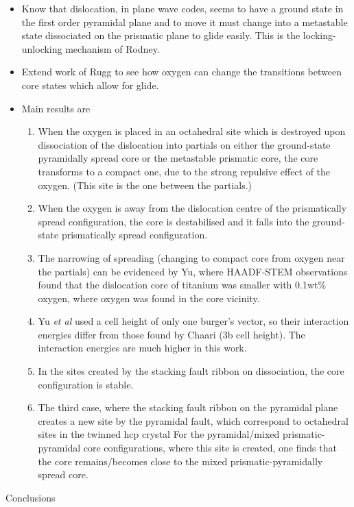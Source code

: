 \documentclass[a4paper,12pt,oneside,print,numbered,index,PageStyleIII]{PhDThesisPSnPDF}
\begin{document}
\begin{itemize}
\item Know that dislocation, in plane wave codes, seems to have a
ground state in the first order pyramidal plane and to move it
must change into a metastable state dissociated on the prismatic
plane to glide easily. This is the locking-unlocking mechanism of
Rodney.
\item Extend work of Rugg to see how oxygen can change the transitions
between core states which allow for glide.

\item Main results are
\begin{enumerate}
\item When the oxygen is placed in an octahedral site which is
destroyed upon dissociation of the dislocation into partials on either the
ground-state pyramidally spread core or the metastable
prismatic core, the core transforms to a compact
one, due to the strong repulsive effect of the oxygen. (This
site is the one between the partials.)
\item When the oxygen is away from the dislocation centre of the prismatically
spread configuration, the core is destabilised and it falls
into the ground-state prismatically spread configuration.
\item The narrowing of spreading (changing to compact core from
oxygen near the partials) can be evidenced by Yu, where
HAADF-STEM observations found that the dislocation core of
titanium was smaller with 0.1wt\% oxygen, where oxygen was
found in the core vicinity.
\item Yu \emph{et al} used a cell height of only one burger's vector, so
their interaction energies differ from those found by Chaari
(3b cell height). The interaction energies are much higher in
this work.
\item In the sites created by the stacking fault ribbon on
dissociation, the core configuration is stable.
\item The third case, where the stacking fault ribbon on the
pyramidal plane creates a new site by the pyramidal fault,
which correspond to octahedral sites in the twinned hcp
crystal For the pyramidal/mixed prismatic-pyramidal core
configurations, where this site is created, one finds that the
core remains/becomes close to the mixed prismatic-pyramidally
spread core.
\end{enumerate}
\end{itemize}

Conclusions
\end{document}
